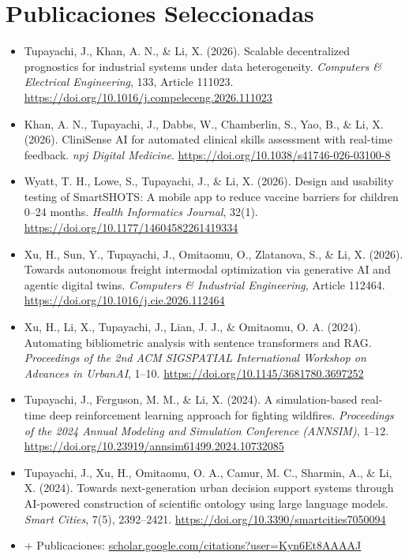 \documentclass[10pt,letterpaper]{article}
\begin{document}
\section{Publicaciones Seleccionadas}
\begin{itemize}\small
\item Tupayachi, J., Khan, A. N., \& Li, X. (2026). Scalable decentralized prognostics for industrial systems under data heterogeneity. \textit{Computers \& Electrical Engineering}, 133, Article 111023. \url{https://doi.org/10.1016/j.compeleceng.2026.111023}
\item Khan, A. N., Tupayachi, J., Dabbs, W., Chamberlin, S., Yao, B., \& Li, X. (2026). CliniSense AI for automated clinical skills assessment with real-time feedback. \textit{npj Digital Medicine}. \url{https://doi.org/10.1038/s41746-026-03100-8}
\item Wyatt, T. H., Lowe, S., Tupayachi, J., \& Li, X. (2026). Design and usability testing of SmartSHOTS: A mobile app to reduce vaccine barriers for children 0--24 months. \textit{Health Informatics Journal}, 32(1). \url{https://doi.org/10.1177/14604582261419334}
\item Xu, H., Sun, Y., Tupayachi, J., Omitaomu, O., Zlatanova, S., \& Li, X. (2026). Towards autonomous freight intermodal optimization via generative AI and agentic digital twins. \textit{Computers \& Industrial Engineering}, Article 112464. \url{https://doi.org/10.1016/j.cie.2026.112464}
\item Xu, H., Li, X., Tupayachi, J., Lian, J. J., \& Omitaomu, O. A. (2024). Automating bibliometric analysis with sentence transformers and RAG. \textit{Proceedings of the 2nd ACM SIGSPATIAL International Workshop on Advances in UrbanAI}, 1--10. \url{https://doi.org/10.1145/3681780.3697252}
\item Tupayachi, J., Ferguson, M. M., \& Li, X. (2024). A simulation-based real-time deep reinforcement learning approach for fighting wildfires. \textit{Proceedings of the 2024 Annual Modeling and Simulation Conference (ANNSIM)}, 1--12. \url{https://doi.org/10.23919/annsim61499.2024.10732085}
\item Tupayachi, J., Xu, H., Omitaomu, O. A., Camur, M. C., Sharmin, A., \& Li, X. (2024). Towards next-generation urban decision support systems through AI-powered construction of scientific ontology using large language models. \textit{Smart Cities}, 7(5), 2392--2421. \url{https://doi.org/10.3390/smartcities7050094}
\item + Publicaciones: \href{https://scholar.google.com/citations?user=Kyn6Et8AAAAJ&hl=en&oi=ao}{scholar.google.com/citations?user=Kyn6Et8AAAAJ}
\end{itemize}
\end{document}

